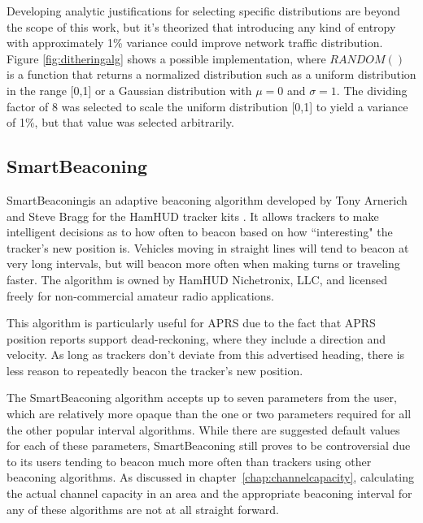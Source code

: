 Developing analytic justifications for selecting specific distributions
are beyond the scope of this work, but it's theorized that introducing
any kind of entropy with approximately 1\% variance could improve network
traffic distribution.
Figure \ref{fig:ditheringalg} shows a possible implementation, where $RANDOM()$
is a function that returns a normalized distribution such as 
a uniform distribution in the range [0,1] 
or a Gaussian distribution with $\mu=0$ and $\sigma=1$.
The dividing factor of 8 was selected to scale the uniform distribution [0,1]
to yield a variance of 1\%, but that value was selected arbitrarily.

\subsection{SmartBeaconing}

SmartBeaconing\texttrademark is an adaptive beaconing algorithm developed
by Tony Arnerich and Steve Bragg for the HamHUD tracker kits \cite{smartbeacon}.
It allows trackers to make intelligent decisions as to how often to beacon
based on how ``interesting" the tracker's new position is. 
Vehicles moving in straight lines will tend to beacon at very long intervals,
but will beacon more often when making turns or traveling faster.
The algorithm is owned by HamHUD Nichetronix, LLC, and licensed freely
for non-commercial amateur radio applications.

This algorithm is particularly useful for APRS due to the fact that APRS
position reports support dead-reckoning, where they include a direction and 
velocity.
As long as trackers don't deviate from this advertised heading, there is
less reason to repeatedly beacon the tracker's new position.

The SmartBeaconing algorithm accepts up to seven parameters 
from the user\cite{smartbeaconwiki},
which are relatively more opaque than the one or two parameters required for
all the other popular interval algorithms. 
While there are suggested default values for each of these parameters, 
SmartBeaconing still proves to be controversial due to its users tending to
beacon much more often than 
trackers using other beaconing algorithms\cite{smartbeaconemail1}.
As discussed in chapter~\ref{chap:channelcapacity}, calculating the 
actual channel capacity in an area and the appropriate beaconing interval
for any of these algorithms are not at all straight forward.

